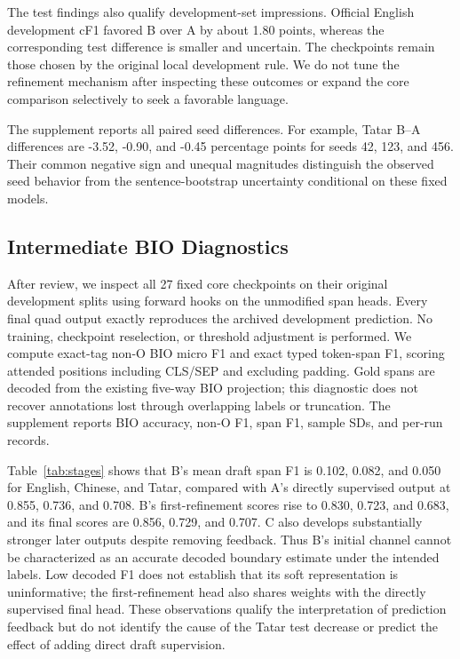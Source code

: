 \documentclass[conference]{IEEEtran}
\begin{document}
The test findings also qualify development-set impressions. Official English development cF1 favored B over A by about 1.80 points, whereas the corresponding test difference is smaller and uncertain. The checkpoints remain those chosen by the original local development rule. We do not tune the refinement mechanism after inspecting these outcomes or expand the core comparison selectively to seek a favorable language.

The supplement reports all paired seed differences. For example, Tatar B--A differences are -3.52, -0.90, and -0.45 percentage points for seeds 42, 123, and 456. Their common negative sign and unequal magnitudes distinguish the observed seed behavior from the sentence-bootstrap uncertainty conditional on these fixed models.

\subsection{Intermediate BIO Diagnostics}

After review, we inspect all 27 fixed core checkpoints on their original development splits using forward hooks on the unmodified span heads. Every final quad output exactly reproduces the archived development prediction. No training, checkpoint reselection, or threshold adjustment is performed. We compute exact-tag non-O BIO micro F1 and exact typed token-span F1, scoring attended positions including CLS/SEP and excluding padding. Gold spans are decoded from the existing five-way BIO projection; this diagnostic does not recover annotations lost through overlapping labels or truncation. The supplement reports BIO accuracy, non-O F1, span F1, sample SDs, and per-run records.

Table~\ref{tab:stages} shows that B's mean draft span F1 is 0.102, 0.082, and 0.050 for English, Chinese, and Tatar, compared with A's directly supervised output at 0.855, 0.736, and 0.708. B's first-refinement scores rise to 0.830, 0.723, and 0.683, and its final scores are 0.856, 0.729, and 0.707. C also develops substantially stronger later outputs despite removing feedback. Thus B's initial channel cannot be characterized as an accurate decoded boundary estimate under the intended labels. Low decoded F1 does not establish that its soft representation is uninformative; the first-refinement head also shares weights with the directly supervised final head. These observations qualify the interpretation of prediction feedback but do not identify the cause of the Tatar test decrease or predict the effect of adding direct draft supervision.
\end{document}
